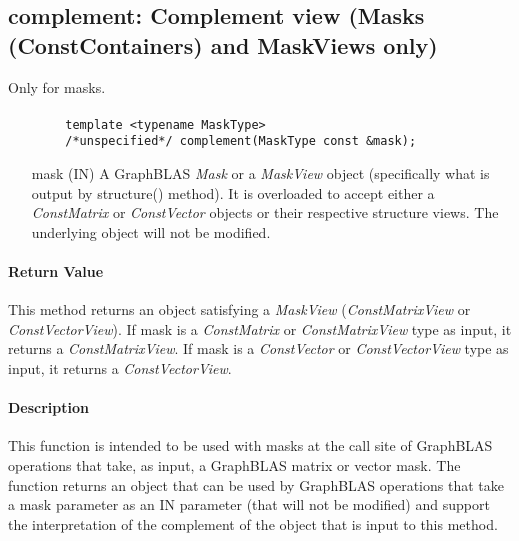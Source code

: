 \subsection{{\sf complement}: Complement view (Masks (ConstContainers) and MaskViews only)}

Only for masks.  

\paragraph{\syntax}

\begin{verbatim}
        template <typename MaskType>
        /*unspecified*/ complement(MaskType const &mask);
\end{verbatim}

\begin{itemize}%
    \item[{\sf mask}] ({\sf IN}) A GraphBLAS \emph{Mask} or a \emph{MaskView}
    object (specifically what is output by structure() method). It is 
    overloaded to accept either a \emph{ConstMatrix} or \emph{ConstVector} 
    objects or their respective structure views.  The underlying object will 
    not be modified.
\end{itemize}

\paragraph{Return Value}

This method returns an object satisfying a \emph{MaskView} (\emph{ConstMatrixView} or 
\emph{ConstVectorView}). If {\sf mask} is a \emph{ConstMatrix} or \emph{ConstMatrixView} type as input, 
it returns a \emph{ConstMatrixView}.  If {\sf mask} is a \emph{ConstVector} or  \emph{ConstVectorView}
type as input, it returns a \emph{ConstVectorView}.  

\paragraph{Description}

This function is intended to be used with masks at the call site of GraphBLAS 
operations that take, as input, a GraphBLAS matrix or vector mask.  The function 
returns an object that can be used by GraphBLAS operations that take a mask 
parameter as an {\sf IN} parameter (that will not be modified) and support the 
interpretation of the complement of the object that is input to this method.

